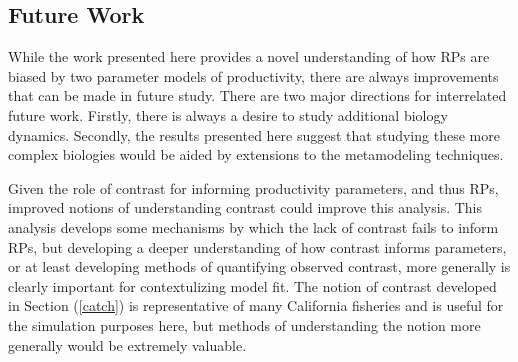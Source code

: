 \documentclass[12pt]{ucscthesis}
\begin{document}
\subsection{Future Work}

While the work presented here provides a novel understanding of how RPs are 
biased by two parameter models of productivity, there are always improvements 
that can be made in future study. There are two major directions for 
interrelated future work. Firstly, there is always a desire to study additional 
biology dynamics. Secondly, the results presented here suggest that studying 
these more complex biologies would be aided by extensions to the metamodeling 
techniques.


%
Given the role of contrast for informing productivity parameters, and thus RPs, 
improved notions of understanding contrast could improve this analysis. This 
analysis develops some mechanisms by which the lack of contrast fails to 
inform RPs, but developing a deeper understanding of how contrast informs 
parameters, or at least developing methods of quantifying observed contrast, 
more generally is clearly important for contextulizing model fit. The notion 
of contrast developed in Section (\ref{catch}) is representative of many 
California fisheries and is useful for the simulation purposes here, but 
methods of understanding the notion more generally would be extremely valuable.  
\end{document}
